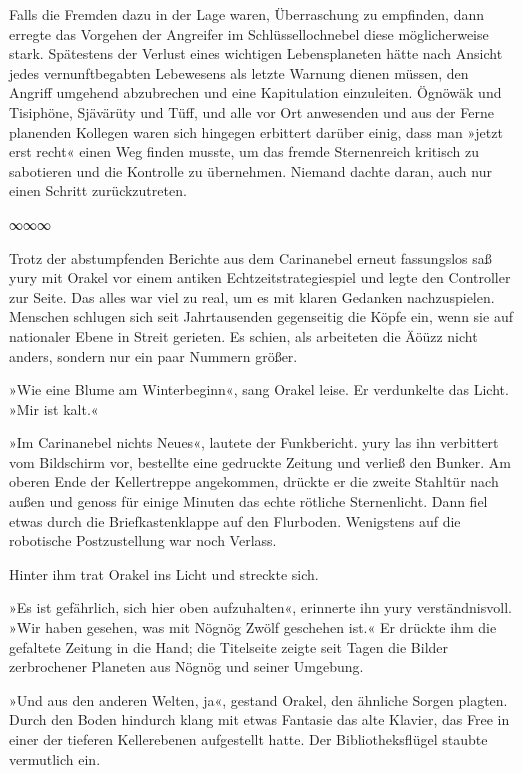 Falls die Fremden dazu in der Lage waren, Überraschung zu empfinden, dann erregte das Vorgehen der Angreifer im Schlüssellochnebel diese möglicherweise stark. Spätestens der Verlust eines wichtigen Lebensplaneten hätte nach Ansicht jedes vernunftbegabten Lebewesens als letzte Warnung dienen müssen, den Angriff umgehend abzubrechen und eine Kapitulation einzuleiten. Ögnöwäk und Tisiphöne, Sjävärüty und Tüff, und alle vor Ort anwesenden und aus der Ferne planenden Kollegen waren sich hingegen erbittert darüber einig, dass man »jetzt erst recht« einen Weg finden musste, um das fremde Sternenreich kritisch zu sabotieren und die Kontrolle zu übernehmen. Niemand dachte daran, auch nur einen Schritt zurückzutreten.

\begin{center}
∞∞∞
\end{center}

Trotz der abstumpfenden Berichte aus dem Carinanebel erneut fassungslos saß yury mit Orakel vor einem antiken Echtzeitstrategiespiel und legte den Controller zur Seite. Das alles war viel zu real, um es mit klaren Gedanken nachzuspielen. Menschen schlugen sich seit Jahrtausenden gegenseitig die Köpfe ein, wenn sie auf nationaler Ebene in Streit gerieten. Es schien, als arbeiteten die Äöüzz nicht anders, sondern nur ein paar Nummern größer.

»Wie eine Blume am Winterbeginn«, sang Orakel leise. Er verdunkelte das Licht. »Mir ist kalt.«

»Im Carinanebel nichts Neues«, lautete der Funkbericht. yury las ihn verbittert vom Bildschirm vor, bestellte eine gedruckte Zeitung und verließ den Bunker. Am oberen Ende der Kellertreppe angekommen, drückte er die zweite Stahltür nach außen und genoss für einige Minuten das echte rötliche Sternenlicht. Dann fiel etwas durch die Briefkastenklappe auf den Flurboden. Wenigstens auf die robotische Postzustellung war noch Verlass.

Hinter ihm trat Orakel ins Licht und streckte sich.

»Es ist gefährlich, sich hier oben aufzuhalten«, erinnerte ihn yury verständnisvoll. »Wir haben gesehen, was mit Nögnög Zwölf geschehen ist.« Er drückte ihm die gefaltete Zeitung in die Hand; die Titelseite zeigte seit Tagen die Bilder zerbrochener Planeten aus Nögnög und seiner Umgebung.

»Und aus den anderen Welten, ja«, gestand Orakel, den ähnliche Sorgen plagten. Durch den Boden hindurch klang mit etwas Fantasie das alte Klavier, das Free in einer der tieferen Kellerebenen aufgestellt hatte. Der Bibliotheksflügel staubte vermutlich ein.

